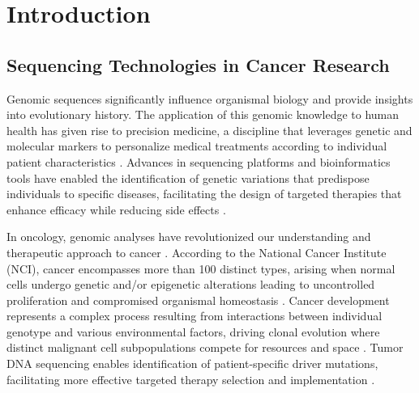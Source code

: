 \chapter{Introduction}

\section{Sequencing Technologies in Cancer Research}




Genomic sequences significantly influence organismal biology and provide 
insights into evolutionary history. The application of this genomic knowledge 
to human health has given rise to precision medicine, a discipline that 
leverages genetic and molecular markers to personalize medical treatments 
according to individual patient characteristics \cite{collins_new_2015}. 
Advances in sequencing platforms and bioinformatics tools have enabled the 
identification of genetic variations that predispose individuals to specific 
diseases, facilitating the design of targeted therapies that enhance efficacy 
while reducing side effects \cite{carrasco-ramiro_human_2017}.

In oncology, genomic analyses have revolutionized our understanding and 
therapeutic approach to cancer \cite{johannessen_progress_2017}. According to 
the National Cancer Institute (NCI), cancer encompasses more than 100 distinct 
types, arising when normal cells undergo genetic and/or epigenetic alterations 
leading to uncontrolled proliferation and compromised organismal homeostasis
\cite{nci_what_2007}. Cancer development represents a complex process resulting 
from interactions between individual genotype and various environmental 
factors, driving clonal evolution where distinct malignant cell subpopulations 
compete for resources and space \cite{turajlic_resolving_2019}. Tumor DNA 
sequencing enables identification of patient-specific driver mutations, 
facilitating more effective targeted therapy selection and implementation 
\cite{sicklick_molecular_2019}.


